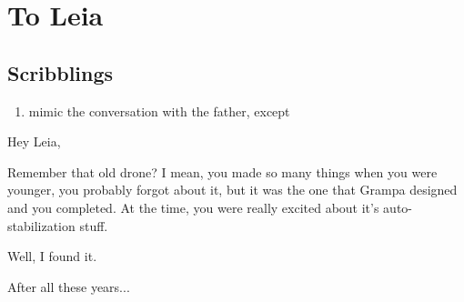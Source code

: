 \chapter{To Leia}

\section{Scribblings}

\begin{enumerate}
\item mimic the conversation with the father, except %
\end{enumerate}

Hey Leia,

Remember that old drone? I mean, you made so many things when you were younger, you probably forgot about it, but it was the one that Grampa designed and you completed. At the time, you were really excited about it's auto-stabilization stuff.

Well, I found it.

After all these years...
